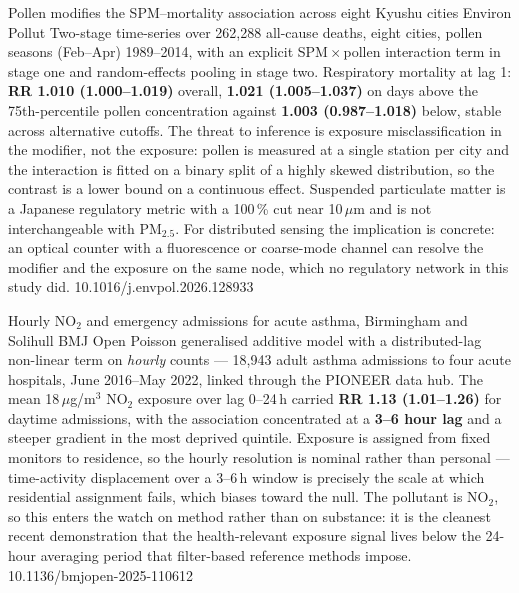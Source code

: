 \documentclass[10pt]{article}
\begin{document}
{Pollen modifies the SPM--mortality association across eight Kyushu cities}
{Environ Pollut}
{Two-stage time-series over 262{,}288 all-cause deaths, eight cities, pollen seasons
(Feb--Apr) 1989--2014, with an explicit SPM\,$\times$\,pollen interaction term in stage one
and random-effects pooling in stage two. Respiratory mortality at lag 1:
\textbf{RR 1.010 (1.000--1.019)} overall, \textbf{1.021 (1.005--1.037)} on days above the
75th-percentile pollen concentration against \textbf{1.003 (0.987--1.018)} below,
stable across alternative cutoffs. The threat to inference is exposure misclassification
in the modifier, not the exposure: pollen is measured at a single station per city and
the interaction is fitted on a binary split of a highly skewed distribution, so the
contrast is a lower bound on a continuous effect. Suspended particulate matter is a
Japanese regulatory metric with a 100\,\% cut near 10\,$\mu$m and is not
interchangeable with PM$_{2.5}$. For distributed sensing the implication is concrete:
an optical counter with a fluorescence or coarse-mode channel can resolve the modifier and
the exposure on the same node, which no regulatory network in this study did.}
{10.1016/j.envpol.2026.128933}

{Hourly NO$_2$ and emergency admissions for acute asthma, Birmingham and Solihull}
{BMJ Open}
{Poisson generalised additive model with a distributed-lag non-linear term on
\emph{hourly} counts --- 18{,}943 adult asthma admissions to four acute hospitals,
June 2016--May 2022, linked through the PIONEER data hub. The mean 18\,$\mu$g/m$^3$
NO$_2$ exposure over lag 0--24\,h carried \textbf{RR 1.13 (1.01--1.26)} for daytime
admissions, with the association concentrated at a \textbf{3--6 hour lag} and a steeper
gradient in the most deprived quintile. Exposure is assigned from fixed monitors to
residence, so the hourly resolution is nominal rather than personal --- time-activity
displacement over a 3--6\,h window is precisely the scale at which residential assignment
fails, which biases toward the null. The pollutant is NO$_2$, so this enters the watch on
method rather than on substance: it is the cleanest recent demonstration that the
health-relevant exposure signal lives below the 24-hour averaging period that
filter-based reference methods impose.}
{10.1136/bmjopen-2025-110612}

\end{document}
